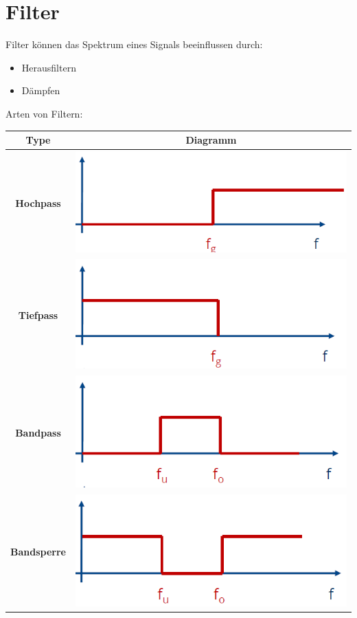 \documentclass[12pt,a4paper]{article}
\newcommand{\nl}{\\[0.1cm]}
\begin{document}
\section{Filter}
Filter können das Spektrum eines Signals beeinflussen durch:
\begin{itemize}
\item Herausfiltern
\item Dämpfen
\end{itemize}
Arten von Filtern:\nl
\begin{tabular}{|c|c|}
\hline
Type & Diagramm\\
\hline
\textbf{Hochpass} & \includegraphics[scale=0.3]{./resources/hochpass.png}\\
\hline
\textbf{Tiefpass} & \includegraphics[scale=0.3]{./resources/tiefpass.png}\\
\hline
\textbf{Bandpass} & \includegraphics[scale=0.3]{./resources/bandpass.png}\\
\hline
\textbf{Bandsperre} & \includegraphics[scale=0.3]{./resources/bandsperre.png}\\
\hline
\end{tabular}
\end{document}
